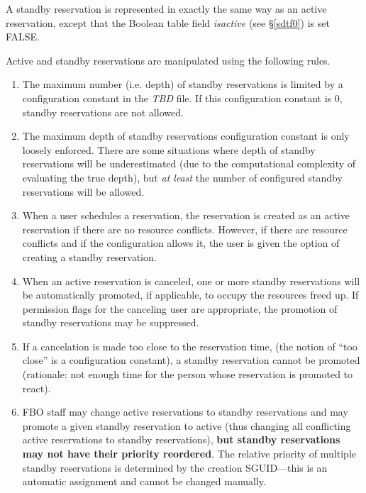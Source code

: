 \documentclass[letterpaper,10pt,titlepage]{article}
\begin{document}
A standby reservation is represented in exactly the same way as an
active reservation, except that
the Boolean table field
\emph{isactive} (see \S{}\ref{sdtf0})
is set FALSE. 

Active and standby reservations are manipulated using the following
rules.

\begin{enumerate}
\item The maximum number (i.e. depth) of standby reservations is limited by
      a configuration constant in the \emph{TBD} file.  If this configuration
      constant is 0, standby reservations are not allowed.
\item The maximum depth of standby reservations configuration constant is 
      only loosely enforced.  There are some situations where depth of standby
      reservations will be underestimated (due to the computational complexity
      of evaluating the true depth), but \emph{at least} the number of configured
      standby reservations will be allowed.
\item When a user schedules a reservation, the reservation is created as an
      active reservation if there are no resource conflicts.  However, if there
      are resource conflicts and if the configuration allows it, the user is given the option of
      creating a standby reservation.
\item When an active reservation is canceled, one or more standby reservations will be
      automatically promoted, if applicable, to occupy the resources freed up.  If
      permission flags for the canceling user are appropriate, the promotion of standby
      reservations may be suppressed.
\item If a cancelation is made too close to the reservation time, (the notion of
      ``too close'' is a configuration constant), a standby reservation cannot be
      promoted (rationale:  not enough time for the person whose reservation is promoted
      to react).
\item FBO staff may change active reservations to standby reservations and may promote a 
      given standby reservation to active (thus changing all conflicting active
      reservations to standby reservations), 
      \textbf{but standby reservations may not have their priority reordered}.  
      The relative priority of multiple standby reservations is determined by the
      creation SGUID---this is an automatic assignment and cannot be changed manually.
\end{enumerate}
\end{document}
